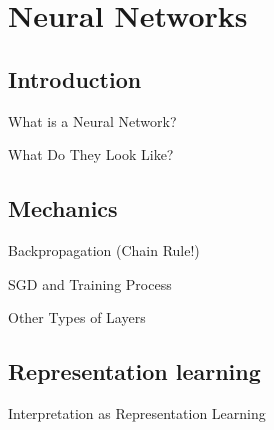 
\section{Neural Networks}
\subsection{Introduction}
\begin{frame}{What is a Neural Network?}

\end{frame}
\begin{frame}{What Do They Look Like?}

\end{frame}
\subsection{Mechanics}
\begin{frame}{Backpropagation (Chain Rule!)}

\end{frame}
\begin{frame}{SGD and Training Process}

\end{frame}
\begin{frame}{Other Types of Layers}

\end{frame}
\subsection{Representation learning}
\begin{frame}{Interpretation as Representation Learning}

\end{frame}
